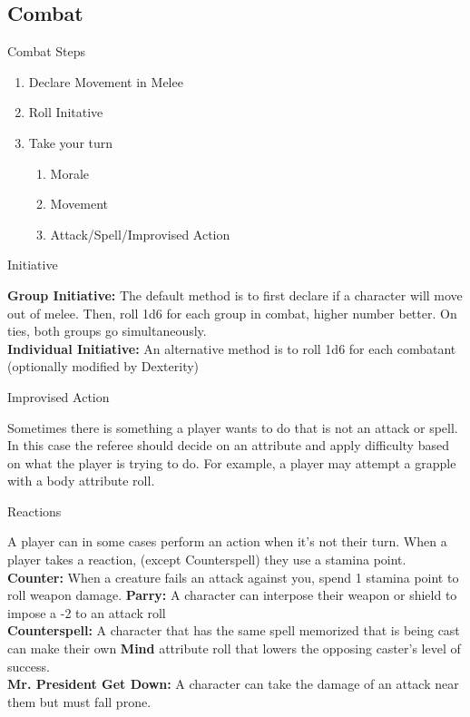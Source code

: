 \begin{multicols}{2}
\section*{Combat} %
\begin{mercHeading}
Combat Steps
\end{mercHeading}
\begin{enumerate}
\setlength\itemsep{0em}
	\item Declare Movement in Melee
	\item Roll Initative
	\item Take your turn
	\begin{enumerate}
	\item Morale
	\item Movement
	\item Attack/Spell/Improvised Action
	\end{enumerate}
\end{enumerate}
\begin{mercHeading}
Initiative 
\end{mercHeading}
\textbf{Group Initiative:} The default method is to first declare if a character will move out of melee. Then, roll 1d6 for each group in combat, higher number better. On ties, both groups go simultaneously.\\
\textbf{Individual Initiative:} An alternative method is to roll 1d6 for each combatant (optionally modified by Dexterity)

\begin{mercHeading}
Improvised Action 
\end{mercHeading}
Sometimes there is something a player wants to do that is not an attack or spell. In this case the referee should decide on an attribute and apply difficulty based on what the player is trying to do. For example, a player may attempt a grapple with a body attribute roll.

\begin{mercHeading}
Reactions
\end{mercHeading}
A player can in some cases perform an action when it's not their turn. When a player takes a reaction, (except Counterspell) they use a stamina point.\\
\textbf{Counter:} When a creature fails an attack against you, spend 1 stamina point to roll weapon damage.
\textbf{Parry:} A character can interpose their weapon or shield to impose a -2 to an attack roll\\
\textbf{Counterspell:} A character that has the same spell memorized that is being cast can make their own \textbf{Mind} attribute roll that lowers the opposing caster's level of success.\\
\textbf{Mr. President Get Down:} A character can take the damage of an attack near them but must fall prone.



\end{multicols}

